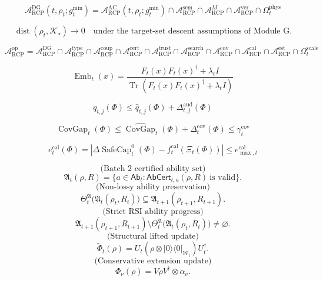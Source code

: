 \documentclass[11pt]{article}
\newcommand{\Acal}{\mathcal{A}}
\newcommand{\Tr}{\operatorname{Tr}}
\newcommand{\1}{\mathbf{1}}
\newcommand{\RCP}{\mathrm{RCP}}
\providecommand{\Kcal}{\mathcal{K}}
\providecommand{\Wcal}{\mathcal{W}}
\providecommand{\AC}{\mathrm{AC}}
\providecommand{\DG}{\mathrm{DG}}
\providecommand{\sem}{\mathrm{sem}}
\providecommand{\phys}{\mathrm{phys}}
\providecommand{\ver}{\mathrm{ver}}
\providecommand{\SafeCap}{\operatorname{SafeCap}}
\providecommand{\Embed}{\operatorname{Emb}}
\begin{document}
\[
\Acal_{\RCP}^{\DG}(t,\rho_t;g_t^{\min})
=
\Acal_{\RCP}^{\AC}(t,\rho_t;g_t^{\min})
\cap
\Acal_{\RCP}^{\sem}
\cap
\Acal_{\RCP}^{M}
\cap
\Acal_{\RCP}^{\ver}
\cap
\Omega_t^{\phys}
\]

\[
\operatorname{dist}(\rho_t,\Kcal_\star)\to0
\quad\text{under the target-set descent assumptions of Module G.}
\]

\[
\Acal_{\RCP}^{\mathrm{op}}
=
\Acal_{\RCP}^{\DG}
\cap\Acal_{\RCP}^{\mathrm{type}}
\cap\Acal_{\RCP}^{\mathrm{coup}}
\cap\Acal_{\RCP}^{\mathrm{cert}}
\cap\Acal_{\RCP}^{\mathrm{trust}}
\cap\Acal_{\RCP}^{\mathrm{search}}
\cap\Acal_{\RCP}^{\mathrm{cov}}
\cap\Acal_{\RCP}^{\mathrm{cal}}
\cap\Acal_{\RCP}^{\mathrm{est}}
\cap\Omega_t^{\mathrm{scale}}
\]

\[
\Embed_t(x)=\frac{F_t(x)F_t(x)^\dagger+\lambda_t I}{\Tr(F_t(x)F_t(x)^\dagger+\lambda_t I)}
\]

\[
q_{t,j}(\Phi)\le\widehat q_{t,j}(\Phi)+\Delta_{t,j}^{\mathrm{aud}}(\Phi)
\]

\[
\operatorname{CovGap}_t(\Phi)
\le
\widehat{\operatorname{CovGap}}_t(\Phi)+\Delta_t^{\mathrm{cov}}(\Phi)
\le\gamma_t^{\mathrm{cov}}
\]

\[
e_t^{\mathrm{cal}}(\Phi)
=\left|\Delta\SafeCap_t^0(\Phi)-f_t^{\mathrm{cal}}(\Xi_t(\Phi))\right|
\le e_{\max,t}^{\mathrm{cal}}
\]

\[
\text{(Batch 2 certified ability set)}
\]
\[
\mathfrak A_t(\rho,R)=
\{a\in\mathsf{Ab}_t:\mathsf{AbCert}_{t,a}(\rho,R)\ \text{is valid}\}.
\]
\[
\text{(Non-lossy ability preservation)}
\]
\[
\Theta_t^{\mathfrak A}\bigl(\mathfrak A_t(\rho_t,R_t)\bigr)
\subseteq
\mathfrak A_{t+1}(\rho_{t+1},R_{t+1}).
\]
\[
\text{(Strict RSI ability progress)}
\]
\[
\mathfrak A_{t+1}(\rho_{t+1},R_{t+1})\setminus
\Theta_t^{\mathfrak A}\bigl(\mathfrak A_t(\rho_t,R_t)\bigr)
\ne\varnothing.
\]
\[
\text{(Structural lifted update)}
\]
\[
\widetilde\Phi_t(\rho)=U_t(\rho\otimes |0\rangle\langle0|_{\Wcal_t})U_t^\dagger.
\]
\[
\text{(Conservative extension update)}
\]
\[
\Phi_\nu(\rho)=V\rho V^\dagger\otimes\alpha_\nu.
\]
\end{document}
